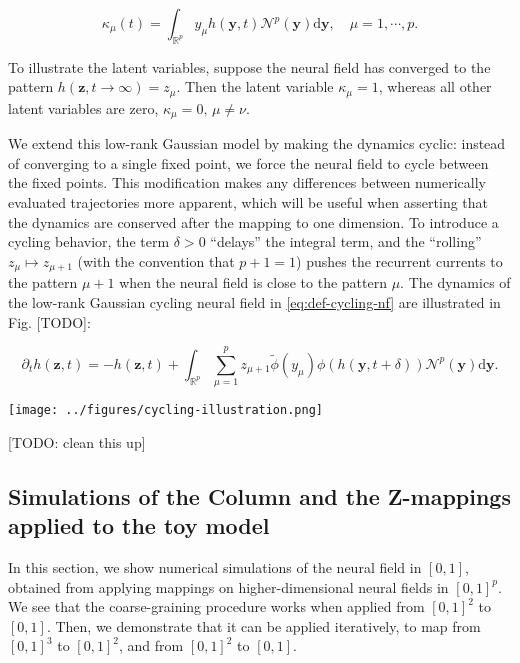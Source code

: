 \documentclass[10pt,letterpaper]{article}
\def\R{\mathbb R}
\def\Rp{\R^p}
\renewcommand{\vec}[1]{\boldsymbol{#1}}
\begin{document}
\begin{equation} \label{eq:def-kappa}
\kappa_\mu(t) = \int_{\Rp} y_\mu h(\vec y, t) \mathcal N^p(\vec y) \mathrm d \vec y,\quad \mu=1,\cdots,p.
\end{equation}

To illustrate the latent variables, suppose the neural field has converged to the pattern $h(\vec z, t \to \infty) = z_\mu$. Then the latent variable $\kappa_\mu = 1$, whereas all other latent variables are zero, $\kappa_\mu=0,\,\mu\neq\nu$.

We extend this low-rank Gaussian model by making the dynamics cyclic: instead of converging to a single fixed point, we force the neural field to cycle between the fixed points. This modification makes any differences between numerically evaluated trajectories more apparent, which will be useful when asserting that the dynamics are conserved after the mapping to one dimension. To introduce a cycling behavior, the term $\delta > 0$ ``delays'' the integral term, and the ``rolling'' $z_\mu \mapsto z_{\mu+1}$ (with the convention that $p+1=1$) pushes the recurrent currents to the pattern $\mu+1$ when the neural field is close to the pattern $\mu$. The dynamics of the low-rank Gaussian cycling neural field in \autoref{eq:def-cycling-nf} are illustrated in Fig. [TODO]:

\begin{equation} \label{eq:def-cycling-nf}
\partial_t h(\vec z, t) = -h(\vec z, t) + \int_{\Rp} \sum_{\mu=1}^p z_{\mu+1} \tilde\phi(y_\mu) \phi(h(\vec y, t+\delta)) \mathcal N^p(\vec y) \mathrm d \vec y.
\end{equation}

\texttt{[image: ../figures/cycling-illustration.png]}

[TODO: clean this up]
\endif

\subsection{Simulations of the Column and the Z-mappings applied to the toy model}

In this section, we show numerical simulations of the neural field in $[0,1]$, obtained from applying mappings on higher-dimensional neural fields in $[0,1]^p$. We see that the coarse-graining procedure works when applied from $[0,1]^2$ to $[0,1]$. Then, we demonstrate that it can be applied iteratively, to map from $[0,1]^3$ to $[0,1]^2$, and from $[0,1]^2$ to $[0,1]$.
\end{document}
